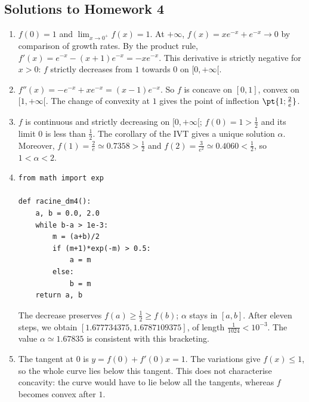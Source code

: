 \subsection{Solutions to Homework 4}\begin{enumerate}
\item $f(0)=1$ and $\lim_{x\to0^+}f(x)=1$. At $+\infty$, $f(x)=xe^{-x}+e^{-x}\to0$ by comparison of growth rates. By the product rule, $f'(x)=e^{-x}-(x+1)e^{-x}=-xe^{-x}$. This derivative is strictly negative for $x>0$: $f$ strictly decreases from $1$ towards $0$ on $[0,+\infty[$.
\item $f''(x)=-e^{-x}+xe^{-x}=(x-1)e^{-x}$. So $f$ is concave on $[0,1]$, convex on $[1,+\infty[$. The change of convexity at $1$ gives the point of inflection $\pt{1;\frac{2}{e}}$.
\item $f$ is continuous and strictly decreasing on $[0,+\infty[$; $f(0)=1>\frac{1}{2}$ and its limit $0$ is less than $\frac{1}{2}$. The corollary of the IVT gives a unique solution $\alpha$. Moreover, $f(1)=\frac{2}{e}\simeq\num{0,7358}>\frac{1}{2}$ and $f(2)=\frac{3}{e^2}\simeq\num{0,4060}<\frac{1}{2}$, so $1<\alpha<2$.
\item 
\begin{lstlisting}
from math import exp

def racine_dm4():
    a, b = 0.0, 2.0
    while b-a > 1e-3:
        m = (a+b)/2
        if (m+1)*exp(-m) > 0.5:
            a = m
        else:
            b = m
    return a, b
\end{lstlisting}
The decrease preserves $f(a)\ge\frac{1}{2}\ge f(b)$; $\alpha$ stays in $[a,b]$. After eleven steps, we obtain $[\num{1,677734375},\num{1,6787109375}]$, of length $\frac{1}{1024}<10^{-3}$. The value $\alpha\simeq\num{1,67835}$ is consistent with this bracketing.
\item The tangent at $0$ is $y=f(0)+f'(0)x=1$. The variations give $f(x)\le1$, so the whole curve lies below this tangent. This does not characterise concavity: the curve would have to lie below all the tangents, whereas $f$ becomes convex after $1$.
\end{enumerate}

\mxnewpage

